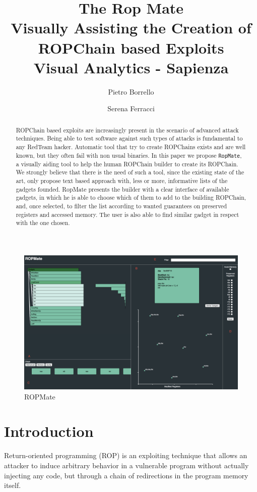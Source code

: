 \documentclass[twocolumn, 11pt]{article}
\title{{\Large \bf The Rop Mate \\ \large Visually Assisting the Creation of ROPChain based Exploits}  \\{\medskip\normalfont\normalsize  Visual Analytics -  Sapienza}}
\author{
{\rm Pietro Borrello}
\and
{\rm Serena Ferracci}}
\date{}
\begin{document}
    \maketitle
    \begin{figure}[htb]
      \centering
      \includegraphics[width=0.9\linewidth]{ropmate-screen}
      \caption{ROPMate}\label{fig:ropmate}
    \end{figure}

\begin{abstract}

ROPChain based exploits are increasingly present in the scenario of advanced attack techniques.
Being able to test software against such types of attacks is fundamental to any RedTeam hacker. Automatic tool that try to create ROPChains exists and are well known, but they often fail with non usual binaries.
In this paper we propose \texttt{RopMate}, a visually aiding tool to help the human ROPChain builder to create its ROPChain. We strongly believe that there is the need of such a tool, since the existing state of the art, only propose text based approach with, less or more, informative lists of the gadgets founded.
RopMate presents the builder with a clear interface of available gadgets, in which he is able to choose which of them to add to the building ROPChain, and, once selected, to filter the list according to wanted guarantees on preserved registers and accessed memory. The user is also able to find similar gadget in respect with the one chosen.
\end{abstract}

\twocolumn
\section{Introduction}
Return-oriented programming (ROP) is an exploiting technique that allows an attacker to induce arbitrary behavior in a vulnerable program without actually injecting any code, but through a chain of redirections in the program memory itself. \cite{rop}
\end{document}

